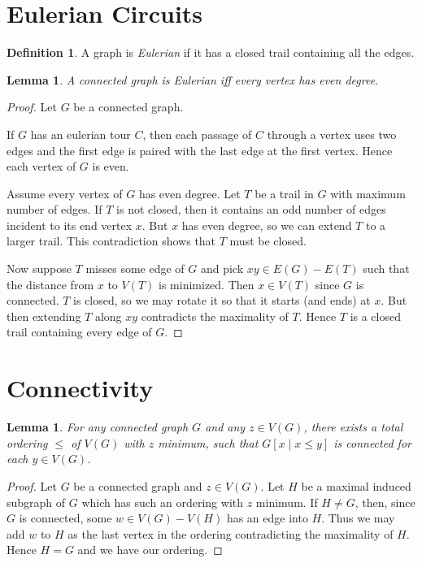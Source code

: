 \documentclass[12pt]{article}
\theoremstyle{plain}
\newtheorem{lem}[thm]{Lemma}
\theoremstyle{definition}
\newtheorem{defn}{Definition}[section]
\theoremstyle{remark}
\begin{document}
\section{Eulerian Circuits}
\begin{defn}
A graph is \emph{Eulerian} if it has a closed trail containing all the edges.
\end{defn}

\begin{lem}\label{Eulerian}
A connected graph is Eulerian iff every vertex has even degree.
\end{lem}
\begin{proof}
Let $G$ be a connected graph.  

If $G$ has an eulerian tour $C$, then each passage of $C$ through a vertex uses two edges and the first edge is paired with the last edge at the first vertex.  Hence each vertex of $G$ is even.

Assume every vertex of $G$ has even degree.  Let $T$ be a trail in $G$ with maximum number of edges.  If $T$ is not closed, then it contains an odd number of edges incident to its end vertex $x$.  But $x$ has even degree, so we can extend $T$ to a larger trail.  This contradiction shows that $T$ must be closed.

Now suppose $T$ misses some edge of $G$ and pick $xy \in E(G) - E(T)$ such that the distance from $x$ to $V(T)$ is minimized.  Then $x \in V(T)$ since $G$ is connected.  $T$ is closed, so we may rotate it so that it starts (and ends) at $x$.  But then extending $T$ along $xy$ contradicts the maximality of $T$.  Hence $T$ is a closed trail containing every edge of $G$.
\end{proof}

\section{Connectivity}
\begin{lem}\label{OrderingLemma}
For any connected graph $G$ and any $z \in V(G)$, there exists a total ordering $\leq$ of $V(G)$ with $z$ minimum, such that $G\left[x \mid x \leq y\right]$ is connected for each $y \in V(G)$.
\end{lem}
\begin{proof}
Let $G$ be a connected graph and $z \in V(G)$.  Let $H$ be a maximal induced subgraph of $G$ which has such an ordering with $z$ minimum.  If $H \neq G$, then, since $G$ is connected, some $w \in V(G) - V(H)$ has an edge into $H$. Thus we may add $w$ to $H$ as the last vertex in the ordering contradicting the maximality of $H$.  Hence $H = G$ and we have our ordering.
\end{proof}
\end{document}

